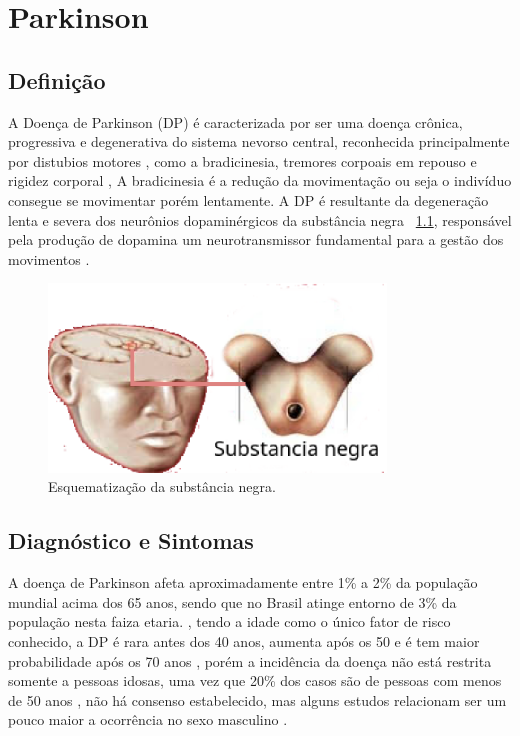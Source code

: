 \chapter{Parkinson}
\section{Definição}

A Doença de Parkinson (DP) é caracterizada por ser uma doença crônica, progressiva e degenerativa do sistema nevorso central, reconhecida principalmente por distubios motores \cite{souzametodos}, como a bradicinesia, tremores corpoais em repouso e rigidez corporal \cite{da2016aspectos}, A bradicinesia é a redução da movimentação ou seja o indivíduo consegue se movimentar porém lentamente. A DP é resultante da degeneração lenta e severa dos neurônios dopaminérgicos da substância negra ~\ref{substanciaNegra}, responsável pela produção de dopamina um neurotransmissor fundamental para a gestão dos movimentos \cite{eftaxias2015detection}.

\begin{figure}[!htb]
   \centering
    \includegraphics[width=0.8\textwidth]{figuras/substancia_negra.eps}
    \caption{Esquematização da substância negra.}
    \label{substanciaNegra}
\end{figure}

\section{Diagnóstico e Sintomas}
A doença de Parkinson afeta aproximadamente entre 1\% a 2\% da população mundial acima dos 65 anos, sendo que no Brasil atinge entorno de 3\% da população nesta faiza etaria. \cite{magalhaes2009descobrindo}, tendo a idade como o único fator de risco conhecido, a DP é rara antes dos 40 anos, aumenta após os 50 e é tem maior probabilidade após os 70 anos \cite{peixinho2006alteraccoes}, porém a incidência da doença não está restrita somente a pessoas idosas, uma vez que 20\% dos casos são de pessoas com menos de 50 anos \cite{gago2014manual}, não há consenso estabelecido, mas alguns estudos relacionam ser um pouco maior a ocorrência no sexo masculino \cite{peixinho2006alteraccoes}.

